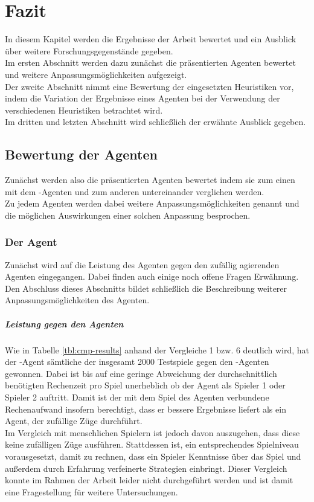 \chapter{Fazit}
\label{Fazit}
In diesem Kapitel werden die Ergebnisse der Arbeit bewertet und ein Ausblick über weitere Forschungsgegenstände gegeben.
\\Im ersten Abschnitt werden dazu zunächst die präsentierten Agenten bewertet und weitere Anpassungsmöglichkeiten aufgezeigt.
\\Der zweite Abschnitt nimmt eine Bewertung der eingesetzten Heuristiken vor, indem die Variation der Ergebnisse eines Agenten bei der Verwendung der verschiedenen Heuristiken betrachtet wird.
\\Im dritten und letzten Abschnitt wird schließlich der erwähnte Ausblick gegeben.   

\section{Bewertung der Agenten}
Zunächst werden also die präsentierten Agenten bewertet indem sie zum einen mit dem -Agenten und zum anderen untereinander verglichen werden.
\\Zu jedem Agenten werden dabei weitere Anpassungsmöglichkeiten genannt und die möglichen Auswirkungen einer solchen Anpassung besprochen.
\subsection{Der Agent \mxZitat{\mc}}
Zunächst wird auf die Leistung des Agenten \mxZitat{\mc} gegen den zufällig agierenden Agenten eingegangen. Dabei finden auch einige noch offene Fragen Erwähnung. Den Abschluss dieses Abschnitts bildet schließlich die Beschreibung weiterer Anpassungsmöglichkeiten des Agenten.  
\paragraph{Leistung gegen den Agenten }
Wie in Tabelle \ref{tbl:cmp-results} anhand der Vergleiche 1 bzw. 6 deutlich wird, hat der \mxZitat{\mc}-Agent sämtliche der insgesamt 2000 Testspiele gegen den -Agenten gewonnen. Dabei ist bis auf eine geringe Abweichung der durchschnittlich benötigten Rechenzeit pro Spiel unerheblich ob der Agent als Spieler 1 oder Spieler 2 auftritt. Damit ist der mit dem Spiel des Agenten verbundene Rechenaufwand insofern berechtigt, dass er bessere Ergebnisse liefert als ein Agent, der zufällige Züge durchführt.
\\Im Vergleich mit menschlichen Spielern ist jedoch davon auszugehen, dass diese keine zufälligen Züge ausführen. Stattdessen ist, ein entsprechendes Spielniveau vorausgesetzt, damit zu rechnen, dass ein Spieler Kenntnisse über das Spiel und außerdem durch Erfahrung verfeinerte Strategien einbringt. Dieser Vergleich konnte im Rahmen der Arbeit leider nicht durchgeführt werden und ist damit eine Fragestellung für weitere Untersuchungen.  
